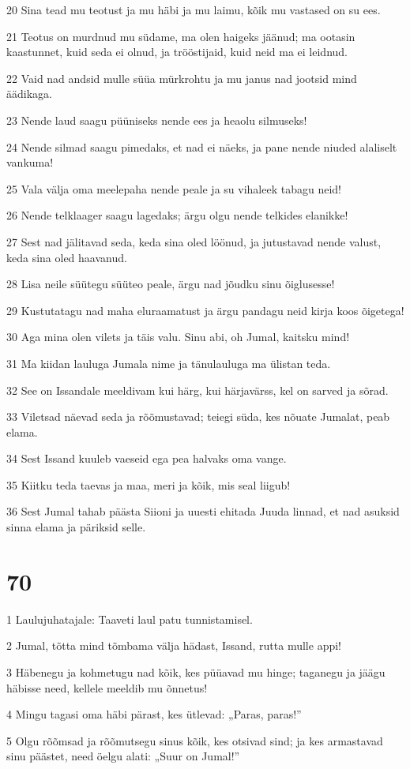 \par 20 Sina tead mu teotust ja mu häbi ja mu laimu, kõik mu vastased on su ees.
\par 21 Teotus on murdnud mu südame, ma olen haigeks jäänud; ma ootasin kaastunnet, kuid seda ei olnud, ja trööstijaid, kuid neid ma ei leidnud.
\par 22 Vaid nad andsid mulle süüa mürkrohtu ja mu janus nad jootsid mind äädikaga.
\par 23 Nende laud saagu püüniseks nende ees ja heaolu silmuseks!
\par 24 Nende silmad saagu pimedaks, et nad ei näeks, ja pane nende niuded alaliselt vankuma!
\par 25 Vala välja oma meelepaha nende peale ja su vihaleek tabagu neid!
\par 26 Nende telklaager saagu lagedaks; ärgu olgu nende telkides elanikke!
\par 27 Sest nad jälitavad seda, keda sina oled löönud, ja jutustavad nende valust, keda sina oled haavanud.
\par 28 Lisa neile süütegu süüteo peale, ärgu nad jõudku sinu õiglusesse!
\par 29 Kustutatagu nad maha eluraamatust ja ärgu pandagu neid kirja koos õigetega!
\par 30 Aga mina olen vilets ja täis valu. Sinu abi, oh Jumal, kaitsku mind!
\par 31 Ma kiidan lauluga Jumala nime ja tänulauluga ma ülistan teda.
\par 32 See on Issandale meeldivam kui härg, kui härjavärss, kel on sarved ja sõrad.
\par 33 Viletsad näevad seda ja rõõmustavad; teiegi süda, kes nõuate Jumalat, peab elama.
\par 34 Sest Issand kuuleb vaeseid ega pea halvaks oma vange.
\par 35 Kiitku teda taevas ja maa, meri ja kõik, mis seal liigub!
\par 36 Sest Jumal tahab päästa Siioni ja uuesti ehitada Juuda linnad, et nad asuksid sinna elama ja päriksid selle.

\chapter{70}

\par 1 Laulujuhatajale: Taaveti laul patu tunnistamisel.
\par 2 Jumal, tõtta mind tõmbama välja hädast, Issand, rutta mulle appi!
\par 3 Häbenegu ja kohmetugu nad kõik, kes püüavad mu hinge; taganegu ja jäägu häbisse need, kellele meeldib mu õnnetus!
\par 4 Mingu tagasi oma häbi pärast, kes ütlevad: „Paras, paras!”
\par 5 Olgu rõõmsad ja rõõmutsegu sinus kõik, kes otsivad sind; ja kes armastavad sinu päästet, need öelgu alati: „Suur on Jumal!”

